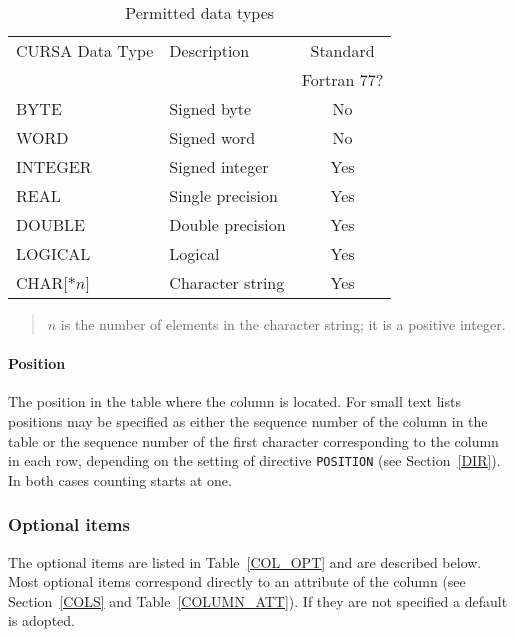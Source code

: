 \documentclass[twoside,11pt]{starlink}
\begin{document}
\begin{table}[htbp]

\begin{center}
\begin{tabular}{llc}
CURSA Data Type & Description      & Standard \\
                &                  & Fortran 77? \\ \hline
BYTE            & Signed byte      & No   \\
WORD            & Signed word      & No   \\
INTEGER         & Signed integer   & Yes  \\
REAL            & Single precision & Yes  \\
DOUBLE          & Double precision & Yes  \\
LOGICAL         & Logical          & Yes  \\
CHAR[$*n$]      & Character string & Yes  \\
\end{tabular}

\begin{quote}
$n$ is the number of elements in the character string; it is a positive
integer.
\end{quote}

\caption{Permitted data types \label{DATA_TYPES} }
\end{center}

\end{table}

\paragraph{Position}  The position in the table where the column is
located.  For small text lists positions may be specified as either the
sequence number of the column in the table or the sequence number of the
first character corresponding to the column in each row, depending
on the setting of directive \texttt{POSITION} (see Section~\ref{DIR}).
In both cases counting starts at one.

\subsubsection{\label{COLOPT}Optional items}

The optional items are listed in Table~\ref{COL_OPT} and are described
below.  Most optional items correspond directly to an attribute of the
column (see Section~\ref{COLS} and Table~\ref{COLUMN_ATT}).  If they are not
specified a default is adopted.
\end{document}

